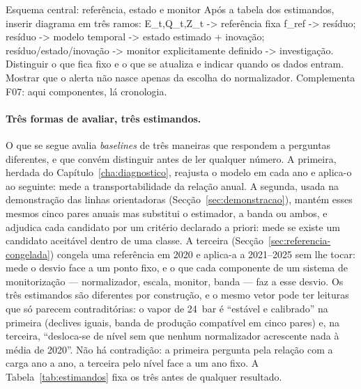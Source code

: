{Esquema central: referência, estado e monitor}
{Após a tabela dos estimandos, inserir diagrama em três ramos:
E\_t,Q\_t,Z\_t -\textgreater{} referência fixa f\_ref -\textgreater{} resíduo;
resíduo -\textgreater{} modelo temporal -\textgreater{} estado estimado + inovação;
resíduo/estado/inovação -\textgreater{} monitor explicitamente definido -\textgreater{} investigação.
Distinguir o que fica fixo e o que se atualiza e indicar quando os
dados entram. Mostrar que o alerta não nasce apenas da escolha do
normalizador. Complementa F07: aqui componentes, lá cronologia.}%
\paragraph{Três formas de avaliar, três estimandos.} O que se segue avalia
\emph{baselines} de três maneiras que respondem a perguntas diferentes, e
que convém distinguir antes de ler qualquer número. A primeira, herdada do
Capítulo~\ref{cha:diagnostico}, reajusta o modelo em cada ano e aplica-o ao
seguinte: mede a transportabilidade da relação anual. A segunda, usada na
demonstração das linhas orientadoras (Secção~\ref{sec:demonstracao}),
mantém esses mesmos cinco pares anuais mas substitui o estimador, a banda ou
ambos, e adjudica cada candidato por um critério declarado a priori: mede se
existe um candidato aceitável dentro de uma classe. A terceira
(Secção~\ref{sec:referencia-congelada}) congela uma referência em 2020 e
aplica-a a 2021--2025 sem lhe tocar: mede o desvio face a um ponto fixo, e o
que cada componente de um sistema de monitorização --- normalizador,
escala, monitor, banda --- faz a esse desvio. Os três estimandos são
diferentes por construção, e o mesmo vetor pode ter leituras que só parecem
contraditórias: o vapor de 24~bar é ``estável e calibrado'' na primeira
(declives iguais, banda de produção compatível em cinco pares) e, na
terceira, ``desloca-se de nível sem que nenhum normalizador acrescente nada
à média de 2020''. Não há contradição: a primeira pergunta pela relação com
a carga ano a ano, a terceira pelo nível face a um ano fixo. A
Tabela~\ref{tab:estimandos} fixa os três antes de qualquer resultado.


